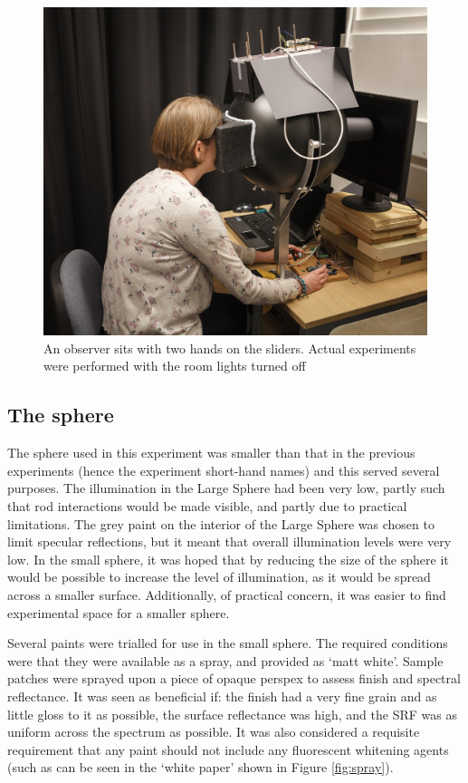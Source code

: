 \begin{figure}[htbp]
\includegraphics[max width=\textwidth,center]{figs/SmallSphere/SSphoto.jpg}
\caption{An observer sits with two hands on the sliders. Actual experiments were performed with the room lights turned off}
\label{fig:SSphoto}
\end{figure}

\subsection{The sphere}

The sphere used in this experiment was smaller than that in the previous experiments (hence the experiment short-hand names) and this served several purposes. The illumination in the Large Sphere had been very low, partly such that rod interactions would be made visible, and partly due to practical limitations. The grey paint on the interior of the Large Sphere was chosen to limit specular reflections, but it meant that overall illumination levels were very low. In the small sphere, it was hoped that by reducing the size of the sphere it would be possible to increase the level of illumination, as it would be spread across a smaller surface. Additionally, of practical concern, it was easier to find experimental space for a smaller sphere.

Several paints were trialled for use in the small sphere. The required conditions were that they were available as a spray, and provided as `matt white'. Sample patches were sprayed upon a piece of opaque perspex to assess finish and spectral reflectance. It was seen as beneficial if: the finish had a very fine grain and as little gloss to it as possible, the surface reflectance was high, and the \gls{SRF} was as uniform across the spectrum as possible. It was also considered a requisite requirement that any paint should not include any fluorescent whitening agents (such as can be seen in the `white paper' shown in Figure \ref{fig:spray}).

